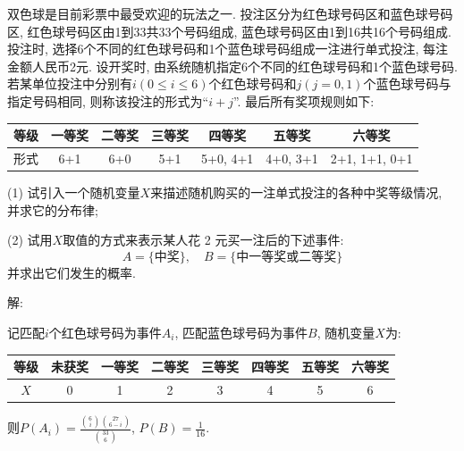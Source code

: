 \documentclass[standard]{ExBook}
\begin{document}
\begin{qitems}
    \begin{bbox}
    \begin{shaded}
        \qitem
双色球是目前彩票中最受欢迎的玩法之一. 投注区分为红色球号码区和蓝色球号码区, 红色球号码区由1到33共33个号码组成, 蓝色球号码区由1到16共16个号码组成.投注时, 选择6个不同的红色球号码和1个蓝色球号码组成一注进行单式投注, 每注金额人民币2元. 设开奖时, 由系统随机指定6个不同的红色球号码和1个蓝色球号码. 若某单位投注中分别有\( i (0 \le i \le 6) \)个红色球号码和\( j (j = 0, 1) \)个蓝色球号码与指定号码相同, 则称该投注的形式为``\( i+j \)''. 最后所有奖项规则如下:
\begin{center}
\begin{tabular}{c|c|c|c|c|c|c}
\hline
等级 & 一等奖 & 二等奖 & 三等奖 & 四等奖 & 五等奖 & 六等奖 \\
\hline
形式 & 6+1 & 6+0 & 5+1 & 5+0, 4+1 & 4+0, 3+1 & 2+1, 1+1, 0+1 \\
\hline
\end{tabular}
\end{center}
(1) 试引入一个随机变量\( X \)来描述随机购买的一注单式投注的各种中奖等级情况, 并求它的分布律;

(2) 试用\( X \)取值的方式来表示某人花 2 元买一注后的下述事件:
\[
A = \{\text{中奖}\}, \quad B = \{\text{中一等奖或二等奖}\}
\]
并求出它们发生的概率.
    \end{shaded}
    \end{bbox}

\vspace{-5em}

    \begin{bbox}
解: 

记匹配$i$个红色球号码为事件$A_{i}$, 匹配蓝色球号码为事件$B$, 随机变量$X$为:
\begin{center}
\begin{tabular}{c|c|c|c|c|c|c|c}
\hline
等级 & 未获奖 & 一等奖 & 二等奖 & 三等奖 & 四等奖 & 五等奖 & 六等奖 \\
\hline
$X$ & 0 & 1 & 2 & 3 & 4 & 5 & 6 \\
\hline
\end{tabular}
\end{center}
则$P(A_{i})=\displaystyle\frac{\binom{6}{i}\binom{27}{6-i}}{\binom{33}{6}}$, $P(B)=\displaystyle\frac{1}{16}$.


\end{bbox}
\end{qitems}
\end{document}
